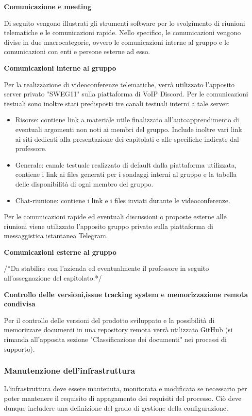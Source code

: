 \textbf{Comunicazione e meeting}

Di seguito  vengono illustrati gli strumenti software per lo svolgimento di riunioni telematiche e le comunicazioni rapide. Nello specifico, le comunicazioni vengono divise in due macrocategorie, ovvero le comunicazioni interne al gruppo e le comunicazioni con enti e persone esterne ad esso.

\textbf{Comunicazioni interne al gruppo}

 Per la realizzazione di videoconferenze telematiche, verrà utilizzato l'apposito server privato "SWEG11" sulla piattaforma di VoIP Discord.
Per le comunicazioni testuali sono inoltre stati predisposti tre canali testuali interni a tale server:

\begin{itemize}
    \item Risorse: contiene link a materiale utile finalizzato all'autoapprendimento di eventuali argomenti non noti ai membri del gruppo. Include inoltre vari link ai siti dedicati alla presentazione dei capitolati e  alle specifiche indicate dal professore.
    \item Generale: canale testuale realizzato di default dalla piattaforma utilizzata, contiene i link ai files generati per i sondaggi interni al gruppo e la tabella delle disponibilità di ogni membro del gruppo. 
    \item Chat-riunione: contiene i link e i files inviati durante le videoconferenze.
\end{itemize}

Per le comunicazioni rapide ed eventuali discussioni o proposte esterne alle riunioni viene utilizzato l'apposito gruppo privato sulla piattaforma di messaggistica istantanea Telegram.

\textbf{Comunicazioni esterne al gruppo}

/*Da stabilire con l'azienda ed eventualmente il professore in seguito all'assegnazione del capitolato.*/

\textbf{Controllo delle versioni,issue tracking system e memorizzazione remota condivisa}

Per il controllo delle versioni del prodotto sviluppato e la possibilità di memorizzare documenti in una repository remota verrà utilizzato GitHub (si rimanda all'apposita sezione "Classificazione dei documenti" nei processi di supporto).

\subsubsection{Manutenzione dell'infrastruttura}

\myparagraph{}L'infrastruttura deve essere mantenuta, monitorata e modificata se necessario per poter mantenere il requisito di appagamento dei requisiti del processo. Ciò deve dunque includere una definizione del grado di gestione della configurazione.
